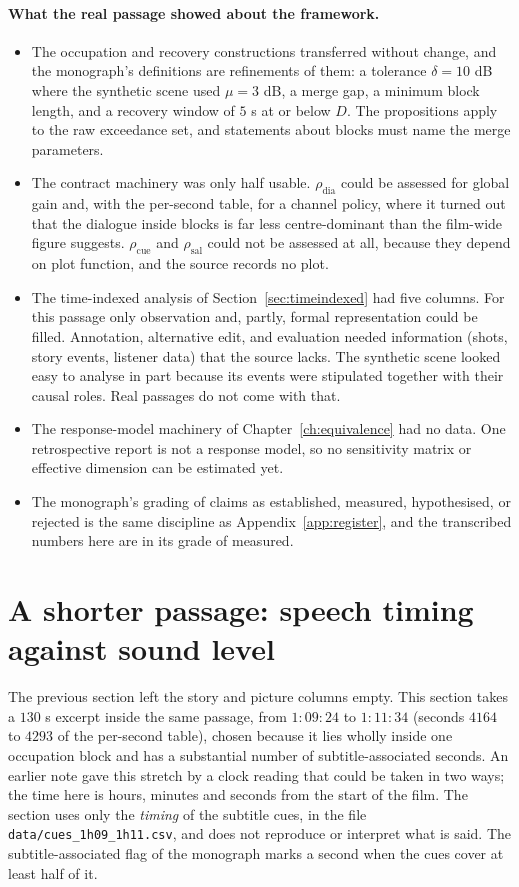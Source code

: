 \paragraph{What the real passage showed about the framework.}
\begin{itemize}
\item The occupation and recovery constructions transferred without change, and the monograph's definitions are refinements of them: a tolerance $\delta=10$ dB where the synthetic scene used $\mu=3$ dB, a merge gap, a minimum block length, and a recovery window of $5$ s at or below $D$. The propositions apply to the raw exceedance set, and statements about blocks must name the merge parameters.
\item The contract machinery was only half usable. $\rho_{\mathrm{dia}}$ could be assessed for global gain and, with the per-second table, for a channel policy, where it turned out that the dialogue inside blocks is far less centre-dominant than the film-wide figure suggests. $\rho_{\mathrm{cue}}$ and $\rho_{\mathrm{sal}}$ could not be assessed at all, because they depend on plot function, and the source records no plot.
\item The time-indexed analysis of Section~\ref{sec:timeindexed} had five columns. For this passage only observation and, partly, formal representation could be filled. Annotation, alternative edit, and evaluation needed information (shots, story events, listener data) that the source lacks. The synthetic scene looked easy to analyse in part because its events were stipulated together with their causal roles. Real passages do not come with that.
\item The response-model machinery of Chapter~\ref{ch:equivalence} had no data. One retrospective report is not a response model, so no sensitivity matrix or effective dimension can be estimated yet.
\item The monograph's grading of claims as established, measured, hypothesised, or rejected is the same discipline as Appendix~\ref{app:register}, and the transcribed numbers here are in its grade of measured.
\end{itemize}

\section{A shorter passage: speech timing against sound level}\label{sec:excerpt}

The previous section left the story and picture columns empty. This section takes a $130$ s excerpt inside the same passage, from $1{:}09{:}24$ to $1{:}11{:}34$ (seconds $4164$ to $4293$ of the per-second table), chosen because it lies wholly inside one occupation block and has a substantial number of subtitle-associated seconds. An earlier note gave this stretch by a clock reading that could be taken in two ways; the time here is hours, minutes and seconds from the start of the film. The section uses only the \emph{timing} of the subtitle cues, in the file \texttt{data/cues\_1h09\_1h11.csv}, and does not reproduce or interpret what is said. The subtitle-associated flag of the monograph marks a second when the cues cover at least half of it.

